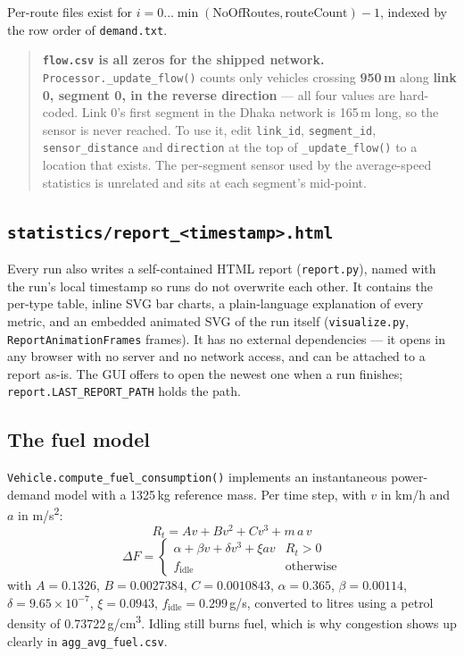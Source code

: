 \documentclass[11pt, a4paper]{article}
\newcommand{\code}[1]{\texttt{#1}}
\begin{document}
\medskip
Per-route files exist for
$i = 0 \dots \min(\text{NoOfRoutes}, \text{routeCount})-1$, indexed by the row
order of \code{demand.txt}.

\begin{quote}
\textbf{\code{flow.csv} is all zeros for the shipped network.}
\code{Processor.\_update\_flow()} counts only vehicles crossing \textbf{950\,m}
along \textbf{link 0, segment 0, in the reverse direction} --- all four values
are hard-coded. Link 0's first segment in the Dhaka network is 165\,m long, so
the sensor is never reached. To use it, edit \code{link\_id},
\code{segment\_id}, \code{sensor\_distance} and \code{direction} at the top of
\code{\_update\_flow()} to a location that exists. The per-segment sensor used by
the average-speed statistics is unrelated and sits at each segment's mid-point.
\end{quote}

\subsection{\code{statistics/report\_<timestamp>.html}}

Every run also writes a self-contained HTML report (\code{report.py}), named with
the run's local timestamp so runs do not overwrite each other. It contains the
per-type table, inline SVG bar charts, a plain-language explanation of every
metric, and an embedded animated SVG of the run itself (\code{visualize.py},
\code{ReportAnimationFrames} frames). It has no external dependencies --- it
opens in any browser with no server and no network access, and can be attached to
a report as-is. The GUI offers to open the newest one when a run finishes;
\code{report.LAST\_REPORT\_PATH} holds the path.

\subsection{The fuel model}

\code{Vehicle.compute\_fuel\_consumption()} implements an instantaneous
power-demand model with a 1325\,kg reference mass. Per time step, with $v$ in
km/h and $a$ in m/s\textsuperscript{2}:
\[
    R_t = Av + Bv^2 + Cv^3 + m\,a\,v
\]
\[
    \Delta F = \begin{cases}
        \alpha + \beta v + \delta v^3 + \xi a v & R_t > 0 \\
        f_{\text{idle}} & \text{otherwise}
    \end{cases}
\]
with $A = 0.1326$, $B = 0.0027384$, $C = 0.0010843$, $\alpha = 0.365$,
$\beta = 0.00114$, $\delta = 9.65 \times 10^{-7}$, $\xi = 0.0943$,
$f_{\text{idle}} = 0.299$\,g/s, converted to litres using a petrol density of
0.73722\,g/cm\textsuperscript{3}. Idling still burns fuel, which is why
congestion shows up clearly in \code{agg\_avg\_fuel.csv}.
\end{document}
